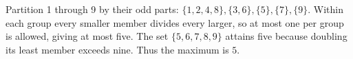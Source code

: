 Partition 1 through 9 by their odd parts: $\{1,2,4,8\},\{3,6\},\{5\},\{7\},\{9\}$. Within each group every smaller member divides every larger, so at most one per group is allowed, giving at most five. The set $\{5,6,7,8,9\}$ attains five because doubling its least member exceeds nine. Thus the maximum is $\boxed5$.
